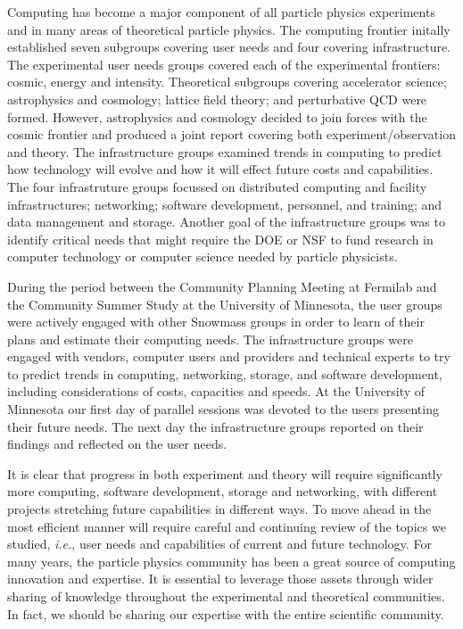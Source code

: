 Computing has become a major component of all particle physics
experiments and in many areas of theoretical particle physics.
The computing frontier initally established seven subgroups
covering user needs and four covering infrastructure.  
The experimental user needs groups
covered each of the experimental frontiers: cosmic, energy and intensity.
Theoretical subgroups covering accelerator science; astrophysics and
cosmology; lattice field theory; and perturbative QCD were formed.  However,
astrophysics and cosmology decided to join forces with the cosmic frontier and produced
a joint report covering both experiment/observation and theory.
The infrastructure groups examined trends in computing
to predict how technology will evolve and how it will effect future
costs and capabilities.
The four infrastruture groups focussed on distributed computing 
and facility infrastructures; networking;
software development, personnel,  and training; and
data management and storage.
Another goal of the infrastructure groups was to identify
critical needs that might require the DOE or NSF to fund
research in computer technology or computer science needed by
particle physicists.

During the period between the Community Planning Meeting at
Fermilab and the Community Summer Study at the University of
Minnesota, the user groups were actively engaged with other
Snowmass groups in order to learn of their plans and estimate their
computing needs.  The infrastructure groups were engaged with
vendors, computer users and providers and technical experts to
try to predict trends in computing, networking, storage, and software
development, including considerations of
costs, capacities and speeds.  At the University of Minnesota our
first day of parallel sessions was devoted to the users presenting
their future needs.  The next day the infrastructure groups
reported on their findings and reflected on the user needs.

It is clear that progress in both experiment and theory will require
significantly more computing, software development, storage and networking, 
with different projects stretching future capabilities in different ways.
To move ahead in the most efficient manner will require careful and
continuing review of the topics we studied, {\it i.e.}, user needs and
capabilities of current and future technology.  
For many years, the particle physics community has been a great source 
of computing innovation and expertise.  It is essential to leverage those
assets through wider sharing of knowledge throughout the experimental
and theoretical communities.  In fact, we should be sharing our
expertise with the entire scientific community.

